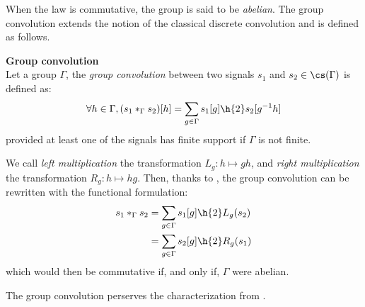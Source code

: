 When the law is commutative, the group is said to be \emph{abelian}.
The group convolution extends the notion of the classical discrete convolution and is defined as follows.

\begin{definition}\textbf{Group convolution}\\
Let a group $\Gamma$, the \emph{group convolution} between two signals $s_1$ and $s_2 \in \cs(\Gamma)$ is defined as:
\begin{align*}
\forall h \in \Gamma, (s_1 \ast_{\Gamma} s_2) [h] = \displaystyle \sum_{g \in \Gamma} s_1[g] \h{2} s_2[g^{-1}h]
\end{align*}
provided at least one of the signals has finite support if $\Gamma$ is not finite.
\label{def:conv1}
\end{definition}

We call \emph{left multiplication} the transformation $L_g: h \mapsto gh$, and \emph{right multiplication} the transformation $R_g: h \mapsto hg$. Then, thanks to , the group convolution can be rewritten with the functional formulation:
\begin{align}
s_1 \ast_{\Gamma} s_2 & = \displaystyle \sum_{g \in \Gamma} s_1[g] \h{2} L_g(s_2) \label{eq:lm}\\
                      &  = \displaystyle \sum_{g \in \Gamma} s_2[g] \h{2} R_g(s_1) \label{eq:rm}
\end{align}
which would then be commutative if, and only if, $\Gamma$ were abelian.

The group convolution perserves the characterization from .

